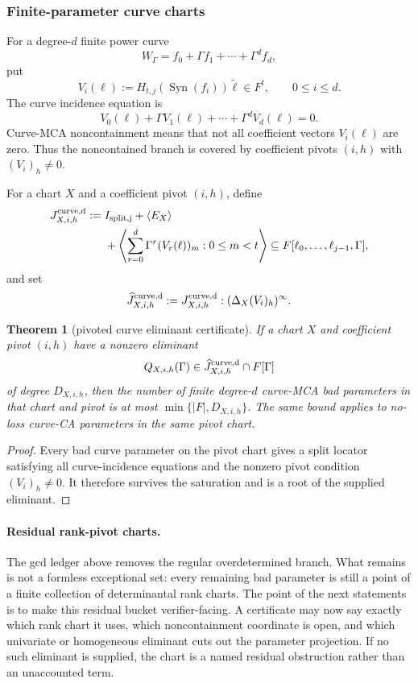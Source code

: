 \documentclass[11pt]{article}
\newtheorem{theorem}{Theorem}[section]
\theoremstyle{definition}
\theoremstyle{remark}
\newcommand{\Syn}{\operatorname{Syn}}
\begin{document}
\subsubsection{Finite-parameter curve charts}

For a degree-$d$ finite power curve
\[
        W_\Gamma=f_0+\Gamma f_1+\cdots+\Gamma^d f_d,
\]
put
\[
        V_i(\ell):=H_{t,j}(\Syn(f_i))\widetilde\ell\in F^t,
        \qquad 0\le i\le d .
\]
The curve incidence equation is
\[
        V_0(\ell)+\Gamma V_1(\ell)+\cdots+\Gamma^d V_d(\ell)=0 .
\]
Curve-MCA noncontainment means that not all coefficient vectors $V_i(\ell)$ are
zero.  Thus the noncontained branch is covered by coefficient pivots
$(i,h)$ with $(V_i)_h\ne0$.

For a chart $X$ and a coefficient pivot $(i,h)$, define
\[
\begin{aligned}
        J^{\rm curve,d}_{X,i,h}:={}&
        I_{\rm split,j}+\langle E_X\rangle \\
        &+\left\langle
          \sum_{r=0}^d \Gamma^r (V_r(\ell))_m:
          0\le m<t
          \right\rangle
        \subseteq F[\ell_0,\ldots,\ell_{j-1},\Gamma],
\end{aligned}
\]
and set
\[
        \widehat J^{\rm curve,d}_{X,i,h}
        :=J^{\rm curve,d}_{X,i,h}:(\Delta_X (V_i)_h)^\infty .
\]

\begin{theorem}[pivoted curve eliminant certificate]
\label{thm:aperiodic-curve-eliminant}
If a chart $X$ and coefficient pivot $(i,h)$ have a nonzero eliminant
\[
        Q_{X,i,h}(\Gamma)\in
        \widehat J^{\rm curve,d}_{X,i,h}\cap F[\Gamma]
\]
of degree $D_{X,i,h}$, then the number of finite degree-$d$ curve-MCA bad
parameters in that chart and pivot is at most $\min\{|F|,D_{X,i,h}\}$.  The same
bound applies to no-loss curve-CA parameters in the same pivot chart.
\end{theorem}

\begin{proof}
Every bad curve parameter on the pivot chart gives a split locator satisfying all
curve-incidence equations and the nonzero pivot condition $(V_i)_h\ne0$.  It
therefore survives the saturation and is a root of the supplied eliminant.
\end{proof}

\paragraph{Residual rank-pivot charts.}
The gcd ledger above removes the regular overdetermined branch.  What remains is
not a formless exceptional set: every remaining bad parameter is still a point of
a finite collection of determinantal rank charts.  The point of the next
statements is to make this residual bucket verifier-facing.  A certificate may
now say exactly which rank chart it uses, which noncontainment coordinate is
open, and which univariate or homogeneous eliminant cuts out the parameter
projection.  If no such eliminant is supplied, the chart is a named residual
obstruction rather than an unaccounted term.
\end{document}
